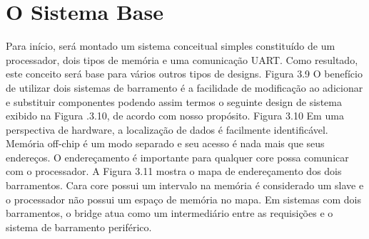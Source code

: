 \section{O Sistema Base}
Para início, será montado um sistema conceitual simples constituído de um processador, dois tipos de memória e uma comunicação UART. Como resultado, este conceito será base para vários outros tipos de designs.
Figura 3.9
O benefício de utilizar dois sistemas de barramento é a facilidade de modificação ao adicionar e substituir componentes podendo assim termos o seguinte design de sistema exibido na Figura .3.10, de acordo com nosso propósito.
Figura 3.10
Em uma perspectiva de hardware, a localização de dados é facilmente identificável. Memória off-chip é um modo separado e seu acesso é nada mais que seus endereços. O endereçamento é importante para qualquer core possa comunicar com o processador. A Figura 3.11 mostra o mapa de endereçamento dos dois barramentos. Cara core possui um intervalo na memória é considerado um slave e o processador não possui um espaço de memória no mapa. Em sistemas com dois barramentos, o bridge atua como um intermediário entre as requisições e o sistema de barramento periférico.

